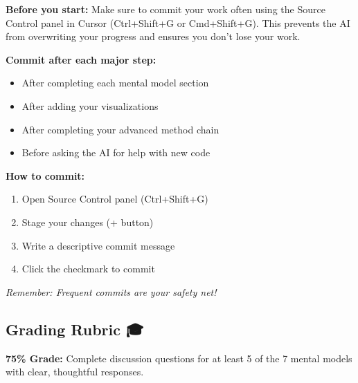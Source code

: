 \documentclass[
  letterpaper,
  DIV=11,
  numbers=noendperiod]{scrartcl}
\providecommand{\tightlist}{%
  \setlength{\itemsep}{0pt}\setlength{\parskip}{0pt}}
\begin{document}
\begin{tcolorbox}[enhanced jigsaw, colframe=quarto-callout-warning-color-frame, title=\textcolor{quarto-callout-warning-color}{\faExclamationTriangle}\hspace{0.5em}{💾 Important: Save Your Work Frequently!}, breakable, opacityback=0, arc=.35mm, leftrule=.75mm, titlerule=0mm, left=2mm, toptitle=1mm, rightrule=.15mm, bottomtitle=1mm, bottomrule=.15mm, opacitybacktitle=0.6, toprule=.15mm, colback=white, coltitle=black, colbacktitle=quarto-callout-warning-color!10!white]

\textbf{Before you start:} Make sure to commit your work often using the
Source Control panel in Cursor (Ctrl+Shift+G or Cmd+Shift+G). This
prevents the AI from overwriting your progress and ensures you don't
lose your work.

\textbf{Commit after each major step:}

\begin{itemize}
\tightlist
\item
  After completing each mental model section
\item
  After adding your visualizations
\item
  After completing your advanced method chain
\item
  Before asking the AI for help with new code
\end{itemize}

\textbf{How to commit:}

\begin{enumerate}
\def\labelenumi{\arabic{enumi}.}
\tightlist
\item
  Open Source Control panel (Ctrl+Shift+G)
\item
  Stage your changes (+ button)
\item
  Write a descriptive commit message
\item
  Click the checkmark to commit
\end{enumerate}

\emph{Remember: Frequent commits are your safety net!}

\end{tcolorbox}

\subsection{Grading Rubric 🎓}\label{grading-rubric}

\textbf{75\% Grade:} Complete discussion questions for at least 5 of the
7 mental models with clear, thoughtful responses.
\end{document}
